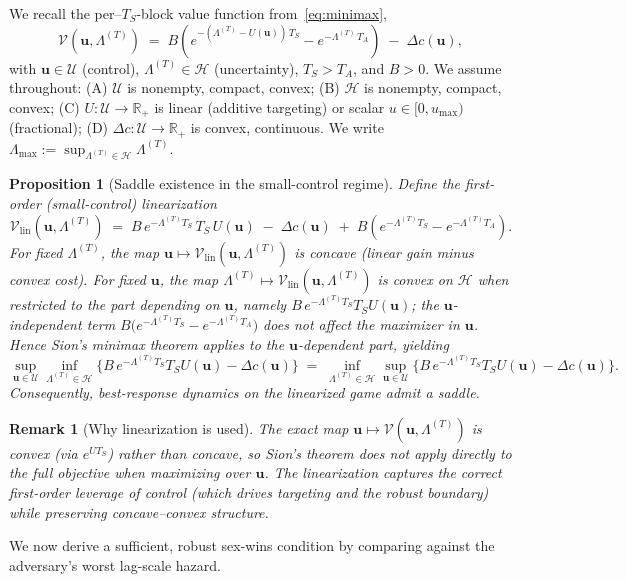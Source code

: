 \documentclass[11pt]{article}
\theoremstyle{upright}
\newtheorem{proposition}{Proposition}
\newtheorem{remark}{Remark}
\newcommand{\horizon}{\Lambda}
\newcommand{\Lmax}{\horizon^{(T)}_{\max}}
\newcommand{\Uset}{\mathcal{U}}
\newcommand{\Hset}{\mathcal{H}}
\newcommand{\hazT}[1]{\Lambda^{(#1)}}          %
\renewcommand{\Lmax}{\Lambda_{\max}}
\begin{document}
We recall the per–$T_S$-block value function from~\eqref{eq:minimax},
\[
\mathcal V(\mathbf u,\hazT{T}) \;=\;
B\!\left(e^{-(\hazT{T}-U(\mathbf u))\,T_S}-e^{-\hazT{T}\,T_A}\right)\;-\;\Delta c(\mathbf u),
\]
with $\mathbf u\in\Uset$ (control), $\hazT{T}\in\Hset$ (uncertainty), $T_S>T_A$, and $B>0$.
We assume throughout: (A) $\Uset$ is nonempty, compact, convex; (B) $\Hset$ is nonempty, compact, convex;
(C) $U:\Uset\!\to\!\mathbb R_+$ is linear (additive targeting) or scalar $u\in[0,u_{\max})$ (fractional);
(D) $\Delta c:\Uset\!\to\!\mathbb R_+$ is convex, continuous. We write $\Lmax:=\sup_{\hazT{T}\in\Hset}\hazT{T}$.

\begin{proposition}[Saddle existence in the small-control regime]\label{prop:sion}
Define the first-order (small-control) linearization
\[
\mathcal V_{\mathrm{lin}}(\mathbf u,\hazT{T})
\;=\; B\,e^{-\hazT{T}T_S}\,T_S\,U(\mathbf u)\;-\;\Delta c(\mathbf u)\;+\;B\!\left(e^{-\hazT{T}T_S}-e^{-\hazT{T}T_A}\right).
\]
For fixed $\hazT{T}$, the map $\mathbf u\mapsto \mathcal V_{\mathrm{lin}}(\mathbf u,\hazT{T})$ is concave
(linear gain minus convex cost). For fixed $\mathbf u$, the map $\hazT{T}\mapsto \mathcal V_{\mathrm{lin}}(\mathbf u,\hazT{T})$
is convex on $\Hset$ when restricted to the part depending on $\mathbf u$, namely
$B\,e^{-\hazT{T}T_S}T_S U(\mathbf u)$; the $\mathbf u$-independent term
$B\!\big(e^{-\hazT{T}T_S}-e^{-\hazT{T}T_A}\big)$ does not affect the maximizer in $\mathbf u$.
Hence Sion’s minimax theorem applies to the $\mathbf u$-dependent part, yielding
\[
\sup_{\mathbf u\in\Uset}\inf_{\hazT{T}\in\Hset}
\Big\{B\,e^{-\hazT{T}T_S}T_S U(\mathbf u)-\Delta c(\mathbf u)\Big\}
\;=\;
\inf_{\hazT{T}\in\Hset}\sup_{\mathbf u\in\Uset}
\Big\{B\,e^{-\hazT{T}T_S}T_S U(\mathbf u)-\Delta c(\mathbf u)\Big\}.
\]
Consequently, best-response dynamics on the linearized game admit a saddle.
\end{proposition}

\begin{remark}[Why linearization is used]
The exact map $\mathbf u\mapsto \mathcal V(\mathbf u,\hazT{T})$ is convex (via $e^{U T_S}$) rather than concave,
so Sion’s theorem does not apply directly to the full objective when maximizing over $\mathbf u$.
The linearization captures the correct \emph{first-order} leverage of control (which drives targeting and
the robust boundary) while preserving concave–convex structure.
\end{remark}

We now derive a sufficient, robust sex-wins condition by comparing against the adversary’s worst lag-scale hazard.
\end{document}
